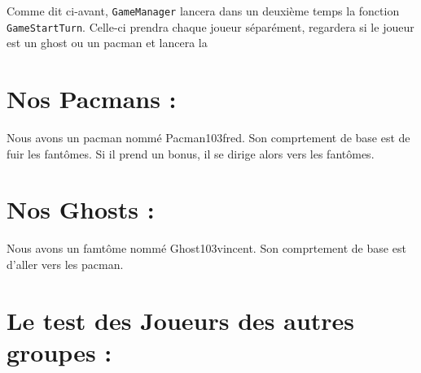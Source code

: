 \documentclass[a4paper, 11pt]{article}
\begin{document}
Comme dit ci-avant, \texttt{GameManager} lancera dans un deuxième temps la fonction \texttt{GameStartTurn}.  Celle-ci prendra chaque joueur séparément, regardera si le joueur est un ghost ou un pacman et lancera la 

\section{Nos Pacmans :}

Nous avons un pacman nommé Pacman103fred. Son comprtement de base est de fuir les fantômes. Si il prend un bonus, il se dirige alors vers les fantômes.

\section{Nos Ghosts :}

Nous avons un famtôme nommé Ghost103vincent. Son comprtement de base est d'aller vers les pacman.

\section{Le test des Joueurs des autres groupes :}
\end{document}
